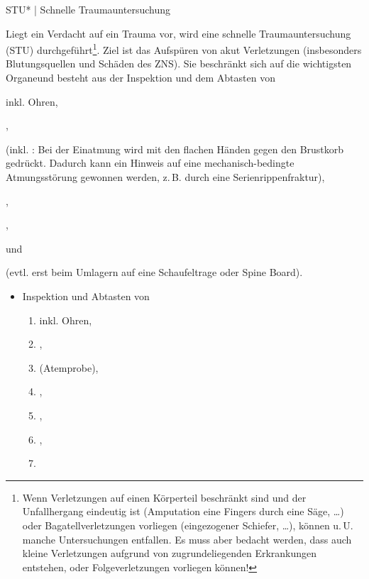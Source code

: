 \TextSlide
{{STU}* | Schnelle Traumauntersuchung}
{%
Liegt ein Verdacht auf ein Trauma
vor, wird eine schnelle Traumauntersuchung (STU)
durchgeführt\footnote{Wenn Verletzungen auf einen 
Körperteil beschränkt sind und
der Unfallhergang eindeutig ist (Amputation eine Fingers
durch eine Säge, \ldots) oder Bagatellverletzungen vorliegen
(eingezogener Schiefer, \ldots), können u.\,U. manche
Untersuchungen entfallen. Es muss aber bedacht werden, dass
auch kleine Verletzungen aufgrund von zugrundeliegenden
Erkrankungen entstehen, oder Folgeverletzungen vorliegen
können!}. 
Ziel ist das Aufspüren von akut
 Verletzungen (insbesonders Blutungsquellen und Schäden des ZNS). 
Sie beschränkt sich auf
die wichtigsten Organeund  besteht aus der  Inspektion
  und dem Abtasten von
  \begin{compactenum}
    \item {} inkl. Ohren,
    \item {},
    \item {} 
    (inkl. : Bei der Einatmung wird mit den flachen Händen
    gegen den Brustkorb gedrückt. 
    Dadurch kann ein Hinweis auf eine mechanisch-bedingte Atmungsstörung 
    gewonnen werden, z.\,B. durch eine Serienrippenfraktur),
    \item {},
    \item {},
    \item {} und
    \item {} (evtl. erst beim Umlagern auf eine Schaufeltrage oder Spine Board).
  \end{compactenum}
}
{\begin{itemize}
  \item Inspektion
  und Abtasten von
  \begin{enumerate}
    \item {} inkl. Ohren,
    \item {},
    \item {} (Atemprobe),
    \item {},
    \item {},
    \item {},
    \item {}
  \end{enumerate}
\end{itemize}}
{}
{}
{}




